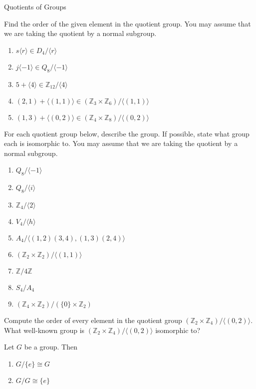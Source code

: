 \begin{section}{Quotients of Groups}
\begin{problem}%
Find the order of the given element in the quotient group. You may assume that we are taking the quotient by a normal subgroup. 
\begin{enumerate}[label=\textrm{(\alph*)}]
\item $s\langle r\rangle \in D_4/\langle r\rangle$
\item $j\langle -1\rangle \in Q_8/\langle -1\rangle$
\item $5+\langle 4\rangle \in \mathbb{Z}_{12}/\langle 4\rangle$
\item $(2,1)+\langle (1,1)\rangle \in (\mathbb{Z}_3\times \mathbb{Z}_6)/\langle (1,1)\rangle$
\item $(1,3)+\langle (0,2)\rangle\in (\mathbb{Z}_4\times \mathbb{Z}_8)/\langle (0,2)\rangle$
\end{enumerate}
\end{problem}

\begin{problem}
For each quotient group below, describe the group.  If possible, state what group each is isomorphic to.  You may assume that we are taking the quotient by a normal subgroup. 
\begin{enumerate}[label=\textrm{(\alph*)}]
\item $Q_8/\langle -1\rangle$
\item $Q_8/\langle i\rangle$
\item $\mathbb{Z}_4/\langle 2\rangle$
\item $V_4/\langle h\rangle$
\item $A_4/\langle (1,2)(3,4),(1,3)(2,4)\rangle$
\item $(\mathbb{Z}_2\times \mathbb{Z}_2)/\langle (1,1)\rangle$
\item $\mathbb{Z}/4\mathbb{Z}$
\item $S_4/A_4$
\item $(\mathbb{Z}_4\times \mathbb{Z}_2)/(\{0\}\times \mathbb{Z}_2)$
\end{enumerate}
\end{problem}

\begin{problem}
Compute the order of every element in the quotient group $(\mathbb{Z}_2\times \mathbb{Z}_4)/\langle (0,2)\rangle$. What well-known group is $(\mathbb{Z}_2\times \mathbb{Z}_4)/\langle (0,2)\rangle$ isomorphic to?
\end{problem}

\begin{theorem}
Let $G$ be a group.  Then
\begin{enumerate}[label=\textrm{(\alph*)}]
\item $G/\{e\}\cong G$
\item $G/G\cong \{e\}$
\end{enumerate}
\end{theorem}


\end{section}
